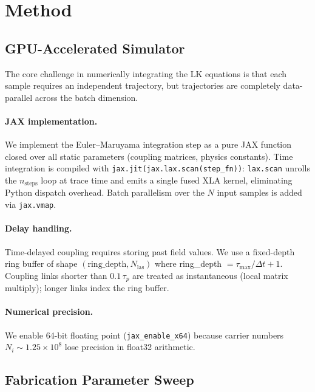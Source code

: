 \documentclass{article}
\begin{document}
\section{Method}
\label{sec:method}

\subsection{GPU-Accelerated Simulator}
\label{sec:gpu}

The core challenge in numerically integrating the LK equations is that
each sample requires an independent trajectory, but trajectories are
completely data-parallel across the batch dimension.

\paragraph{JAX implementation.}
We implement the Euler--Maruyama integration step as a pure JAX function
closed over all static parameters (coupling matrices, physics constants).
Time integration is compiled with \texttt{jax.jit(jax.lax.scan(step\_fn))}:
\texttt{lax.scan} unrolls the $n_\mathrm{steps}$ loop at trace time and
emits a single fused XLA kernel, eliminating Python dispatch overhead.
Batch parallelism over the $N$ input samples is added via \texttt{jax.vmap}.

\paragraph{Delay handling.}
Time-delayed coupling requires storing past field values.
We use a fixed-depth ring buffer of shape $(\text{ring\_depth}, N_\mathrm{las})$
where ring\_depth $= \tau_\mathrm{max}/\Delta t + 1$.
Coupling links shorter than $0.1\,\tau_p$ are treated as instantaneous
(local matrix multiply); longer links index the ring buffer.

\paragraph{Numerical precision.}
We enable 64-bit floating point (\texttt{jax\_enable\_x64}) because carrier
numbers $N_i \sim 1.25 \times 10^8$ lose precision in float32 arithmetic.

\subsection{Fabrication Parameter Sweep}
\label{sec:sweep}
\end{document}
